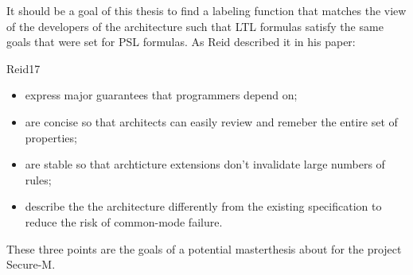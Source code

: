 \documentclass{securem}
\begin{document}
It should be a goal of this thesis to find a labeling function that matches the view of the developers of the architecture such that LTL formulas satisfy the same goals that were set for PSL formulas.
As Reid described it in his paper:
\begin{displaycquote}{Reid17}
    \begin{itemize}
        \item {} express major guarantees that programmers depend on;
        \item are concise so that architects can easily review and remeber the entire set of properties;
        \item are stable so that archticture extensions don't invalidate large numbers of rules;
        \item \textelp{} describe the the architecture differently from the existing specification to reduce the risk of common-mode failure.
    \end{itemize}
\end{displaycquote}

These three points are the goals of a potential masterthesis about for the project Secure-M.



\end{document}
